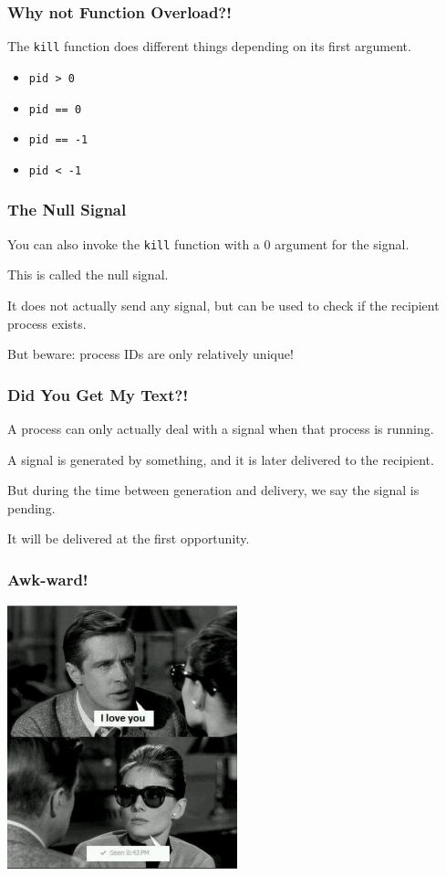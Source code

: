 \begin{frame}
	\frametitle{Why not Function Overload?!}

	The \texttt{kill} function does different things depending on its first argument.

	\begin{itemize}
		\item \texttt{pid > 0}
		\item \texttt{pid == 0}
		\item \texttt{pid == -1}
		\item \texttt{pid < -1}
	\end{itemize}

\end{frame}

\begin{frame}
	\frametitle{The Null Signal}

	You can also invoke the \texttt{kill} function with a 0 argument for the signal.

	This is called the \alert{null signal}.

	It does not actually send any signal, but can be used to check if the recipient process exists.

	But beware: process IDs are only relatively unique!

\end{frame}


\begin{frame}
	\frametitle{Did You Get My Text?!}

	A process can only actually deal with a signal when that process is running.

	A signal is generated by something, and it is later delivered to the recipient.

	But during the time between generation and delivery, we say the signal is \alert{pending}.

	It will be delivered at the first opportunity.

\end{frame}


\begin{frame}
	\frametitle{Awk-ward!}

	\begin{center}
		\includegraphics[width=0.5\textwidth]{images/seenmeme.jpeg}
	\end{center}

\end{frame}


